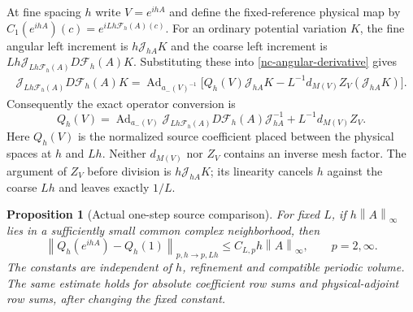 \documentclass[11pt]{article}
\newtheorem{proposition}[theorem]{Proposition}
\theoremstyle{remark}
\newcommand{\norm}[1]{\left\|#1\right\|}
\begin{document}
At fine spacing $h$ write $V=e^{ihA}$ and define the fixed-reference
physical map by
$C_1(e^{ihA})(c)=e^{iLh\mathcal F_h(A)(c)}$. For an ordinary
potential variation $K$, the fine angular left increment is
$h\mathcal J_{hA}K$ and the coarse left increment is
$Lh\mathcal J_{Lh\mathcal F_h(A)}D\mathcal F_h(A)K$.
Substituting these into \eqref{nc-angular-derivative} gives
\begin{equation}
 \begin{split}
 \mathcal J_{Lh\mathcal F_h(A)}D\mathcal F_h(A)K
 =\operatorname{Ad}_{a_-(V)^{-1}}\bigl[
 Q_h(V)\mathcal J_{hA}K
  -L^{-1}d_{M(V)}Z_V(\mathcal J_{hA}K)\bigr].
 \end{split}
 \label{nc-physical-unrearranged}
\end{equation}
Consequently the exact operator conversion is
\begin{equation}
 \boxed{\displaystyle
 Q_h(V)=\operatorname{Ad}_{a_-(V)}
   \mathcal J_{Lh\mathcal F_h(A)}D\mathcal F_h(A)
        \mathcal J_{hA}^{-1}+L^{-1}d_{M(V)}Z_V.}
 \label{nc-physical-conversion}
\end{equation}
Here $Q_h(V)$ is the normalized source coefficient placed between
the physical spaces at $h$ and $Lh$. Neither $d_{M(V)}$ nor $Z_V$
contains an inverse mesh factor. The argument of $Z_V$ before
division is $h\mathcal J_{hA}K$; its linearity cancels $h$ against
the coarse $Lh$ and leaves exactly $1/L$.

\begin{proposition}[Actual one-step source comparison]
\label{nc-one-step-proposition}
For fixed $L$, if $h\norm{A}_\infty$ lies in a sufficiently small
common complex neighborhood, then
\begin{equation}
 \norm{Q_h(e^{ihA})-Q_h(1)}_{p,h\to p,Lh}
     \le C_{L,p}h\norm{A}_\infty,
 \qquad p=2,\infty.
 \label{nc-one-step-bound}
\end{equation}
The constants are independent of $h$, refinement and compatible
periodic volume. The same estimate holds for absolute coefficient
row sums and physical-adjoint row sums, after changing the fixed
constant.
\end{proposition}
\end{document}
